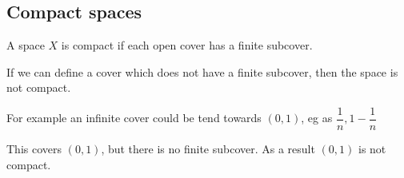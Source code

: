
\subsection{Compact spaces}

A space \(X\) is compact if each open cover has a finite subcover.

If we can define a cover which does not have a finite subcover, then the space is not compact.

For example an infinite cover could be tend towards \((0,1)\), eg as \(\dfrac{1}{n},1-\dfrac{1}{n}\)

This covers \((0,1)\), but there is no finite subcover. As a result \((0,1)\) is not compact.

